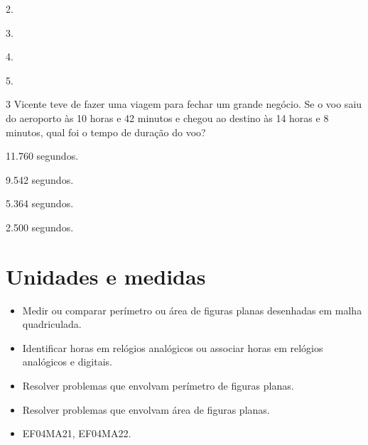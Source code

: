\begin{mdframed}[linewidth=2pt,linecolor=salmao,roundcorner=2pt]
\begin{escolha}
\item
  2.
\item
  3.
\item
  4.
\item
  5.
\end{escolha}


\num{3} Vicente teve de fazer uma viagem para fechar um grande negócio. Se o voo
saiu do aeroporto às 10 horas e 42 minutos e chegou ao destino às 14
horas e 8 minutos, qual foi o tempo de duração do voo?

\begin{escolha}
\item
  11.760 segundos.
\item
  9.542 segundos.
\item
  5.364 segundos.
\item
  2.500 segundos.
\end{escolha}


\chapter{Unidades e medidas}


\begin{itemize}
\item Medir ou comparar perímetro ou área de figuras planas desenhadas em
malha quadriculada.
\item Identificar horas em relógios analógicos ou associar horas em relógios
analógicos e digitais.
\item Resolver problemas que envolvam perímetro de figuras planas.
\item Resolver problemas que envolvam área de figuras planas.
\end{itemize}


\begin{itemize}
\item EF04MA21, EF04MA22.
\end{itemize}

\end{mdframed}
